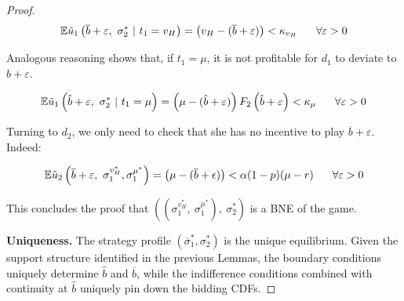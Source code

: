 \documentclass[11pt]{article}
\theoremstyle{plain}
\theoremstyle{definition}
\theoremstyle{plain}
\theoremstyle{plain}
\theoremstyle{plain}
\theoremstyle{plain}
\numberwithin{equation}{section}
\begin{document}
\begin{proof}
\begin{equation*}
 \mathbb{E} \tilde{u}_1 \left( \overline{b} + \varepsilon,\ \sigma_2^* \ | \ t_1 = v_H \right) = \left(v_H - (\overline{b} + \varepsilon) \right) < \kappa_{v_H} \hspace{0.6cm} \forall \varepsilon > 0
\end{equation*}

\vspace{4mm}

\noindent Analogous reasoning shows that, if $ t_1 = \mu $, it is not profitable for $ d_1 $ to deviate to $ \hat{b} + \varepsilon $.

\begin{equation*}
 \mathbb{E} \tilde{u}_1 \left( \hat{b} + \varepsilon,\ \sigma_2^* \ | \ t_1 = \mu \right) = \left( \mu - (\hat{b} + \varepsilon) \right) F_2 \left( \hat{b} + \varepsilon \right) < \kappa_{\mu} \hspace{0.6cm} \forall \varepsilon > 0
\end{equation*}

\vspace{4mm}

\noindent Turning to $ d_2 $, we only need to check that she has no incentive to play $ \overline{b} + \varepsilon $. Indeed:

\begin{equation*}
 \mathbb{E} \tilde{u}_2 \left( \overline{b} + \varepsilon,\ \sigma_1^{v_H^*}, \sigma_1^{\mu^*} \right) = \left( \mu - (\overline{b} + \epsilon) \right) < \alpha (1 - p) (\mu - r) \hspace{0.6cm} \forall \varepsilon > 0
\end{equation*}

\vspace{0.4cm}

\noindent This concludes the proof that $ \left( \left( \sigma_1^{v_H^*},\ \sigma_1^{\mu^{*}} \right), \ \sigma_2^* \right) $ is a BNE of the game.

\vspace{4mm}

\noindent \textbf{Uniqueness.} The strategy profile $ (\overline{\sigma}_1^*, \sigma_2^*) $ is the unique equilibrium. Given the support structure identified in the previous Lemmas, the boundary conditions uniquely determine $ \hat{b} $ and $ \overline{b} $, while the indifference conditions combined with continuity at $ \hat{b} $ uniquely pin down the bidding CDFs.
\end{proof}
\end{document}
